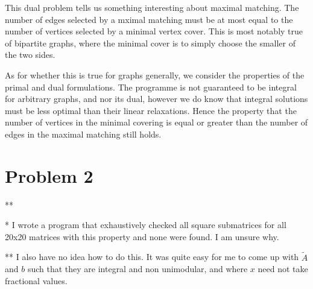 This dual problem tells us something interesting about maximal matching.
The number of edges selected by a mximal matching must be at most equal to the number of vertices selected by a minimal vertex cover.
This is most notably true of bipartite graphs, where the minimal cover is to simply choose the smaller of the two sides.

As for whether this is true for graphs generally, we consider the properties of the primal and dual formulations.
The programme is not guaranteed to be integral for arbitrary graphs, and nor its dual, however we do know that integral solutions must be less optimal than their linear relaxations.
Hence the property that the number of vertices in the minimal covering is equal or greater than the number of edges in the maximal matching still holds.

\section {Problem 2}
**

* I wrote a program that exhaustively checked all square submatrices for all 20x20 matrices with this property and none were found.  I am unsure why.

** I also have no idea how to do this.  It was quite easy for me to come up with $\tilde{A}$ and $b$ such that they are integral and non unimodular, and where $x$ need not take fractional values.


